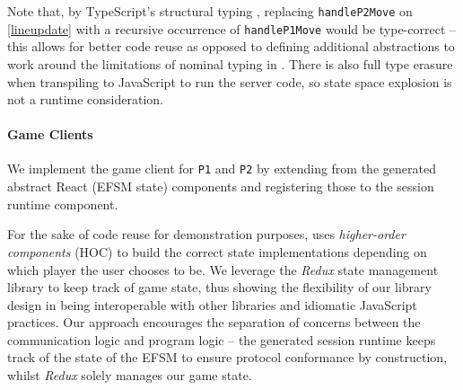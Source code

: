 Note that, by TypeScript's structural typing 
\cite{TypeScriptSpec}, replacing
\texttt{handleP2Move} on \cref{lineupdate} with a recursive 
occurrence of \texttt{handleP1Move} would be
type-correct -- this allows for better code reuse as opposed to 
defining
additional abstractions to work around the limitations of nominal 
typing in
\cite{Hybrid2016}.
There is also full type erasure when transpiling to JavaScript to 
run the server code, so state space explosion is not a 
runtime consideration.

\paragraph{Game Clients}
We implement the game client for \texttt{P1} and
\texttt{P2} by extending from the generated abstract React (EFSM state)
components and registering those to the session runtime component.

For the sake of code reuse for demonstration purposes, \cite{NoughtsAndCrosses}
uses \textit{higher-order components} (HOC) to build the correct state
implementations depending on which player the user chooses to be.
We leverage the \textit{Redux} \cite{Redux} state management library to keep track of game
state, thus showing the flexibility of our library design in being
interoperable with other libraries and idiomatic JavaScript practices.
Our approach encourages the separation of concerns between the 
communication logic and program logic -- the generated session runtime
keeps track of the state of the EFSM to ensure protocol conformance by 
construction, whilst \textit{Redux} solely manages our game state.